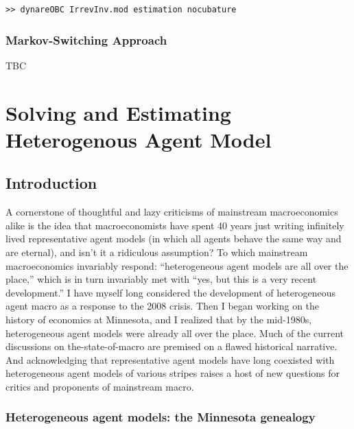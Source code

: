 \documentclass[cn,10pt,math=newtx,citestyle=gb7714-2015,bibstyle=gb7714-2015]{elegantbook}
\begin{document}
\begin{lstlisting}[frame=shadowbox]
	>> dynareOBC IrrevInv.mod estimation nocubature
\end{lstlisting}

\subsection{Markov-Switching Approach}

TBC

	
	\chapter{Solving and Estimating Heterogenous Agent Model}
	
	\section{Introduction}
	
	A cornerstone of thoughtful and lazy criticisms of mainstream macroeconomics alike is the idea that macroeconomists have spent 40 years just writing infinitely lived representative agent models (in which all agents behave the same way and are eternal), and isn’t it a ridiculous assumption? To which mainstream macroeconomics invariably respond: “heterogeneous agent models are all over the place,” which is in turn invariably met with “yes, but this is a very recent development.” I have myself long considered the development of heterogeneous agent macro as a response to the 2008 crisis. Then I began working on the history of economics at Minnesota, and I realized that by the mid-1980s, heterogeneous agent models were already all over the place. Much of the current discussions on the-state-of-macro are premised on a flawed historical narrative. And acknowledging that representative agent models have long coexisted with heterogeneous agent models of various stripes raises a host of new questions for critics and proponents of mainstream macro.
	
	\subsection{Heterogeneous agent models: the Minnesota genealogy}
	
\end{document}
